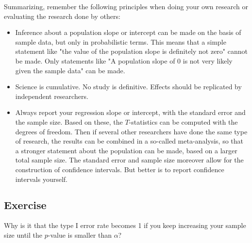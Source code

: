 \documentclass[]{report}\usepackage[]{graphicx}\usepackage[]{color}
\begin{document}
Summarizing, remember the following principles when doing your own research or evaluating the research done by others:

\begin{itemize}

\item Inference about a population slope or intercept can be made on the basis of sample data, but only in probabilistic terms. This means that a simple statement like "the value of the population slope is definitely not zero" cannot be made. Only statements like "A population slope of 0 is not very likely given the sample data" can be made.

\item Science is cumulative. No study is definitive. Effects should be replicated by independent researchers.

\item Always report your regression slope or intercept, with the standard error and the sample size. Based on these, the $T$-statistics can be computed with the degrees of freedom. Then if several other researchers have done the same type of research, the results can be combined in a so-called meta-analysis, so that a stronger statement about the population can be made, based on a larger total sample size. The standard error and sample size moreover allow for the construction of confidence intervals. But better is to report confidence intervals yourself.

\end{itemize}



\subsection{Exercise}

Why is it that the type I error rate becomes 1 if you keep increasing your sample size until the $p$-value is smaller than $\alpha$?
\end{document}
